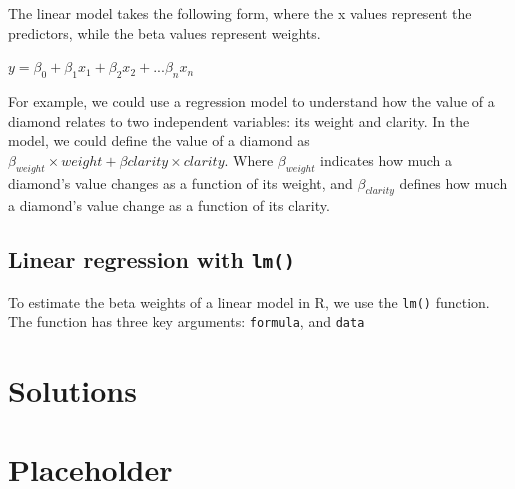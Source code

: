 \documentclass[]{book}
\theoremstyle{definition}
\theoremstyle{definition}
\theoremstyle{remark}
\begin{document}
The linear model takes the following form, where the x values represent
the predictors, while the beta values represent weights.

\(y=\beta_{0}+\beta_{1}x_{1}+\beta_{2}x_{2}+...\beta_{n}x_{n}\)

For example, we could use a regression model to understand how the value
of a diamond relates to two independent variables: its weight and
clarity. In the model, we could define the value of a diamond as
\(\beta_{weight} \times weight + \beta{clarity} \times clarity\). Where
\(\beta_{weight}\) indicates how much a diamond's value changes as a
function of its weight, and \(\beta_{clarity}\) defines how much a
diamond's value change as a function of its clarity.

\section{\texorpdfstring{Linear regression with
\texttt{lm()}}{Linear regression with lm()}}\label{linear-regression-with-lm}

To estimate the beta weights of a linear model in R, we use the
\texttt{lm()} function. The function has three key arguments:
\texttt{formula}, and \texttt{data}

\chapter{Solutions}\label{solutions}

\chapter{Placeholder}\label{placeholder}


\end{document}
